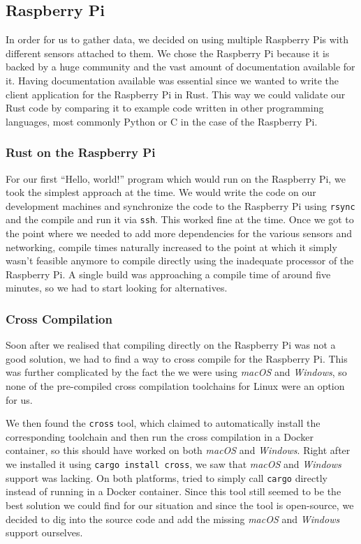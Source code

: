 \subsection{Raspberry Pi}

In order for us to gather data, we decided on using multiple Raspberry Pis with different sensors
attached to them. We chose the Raspberry Pi because it is backed by a huge community and the vast
amount of documentation available for it. Having documentation available was essential since we
wanted to write the client application for the Raspberry Pi in Rust. This way we could validate our
Rust code by comparing it to example code written in other programming languages, most commonly
Python or C in the case of the Raspberry Pi.

\subsubsection{Rust on the Raspberry Pi}

For our first “Hello, world!” program which would run on the Raspberry Pi, we took the simplest
approach at the time. We would write the code on our development machines and synchronize the code
to the Raspberry Pi using \texttt{rsync} and the compile and run it via \texttt{ssh}. This worked
fine at the time. Once we got to the point where we needed to add more dependencies for the various
sensors and networking, compile times naturally increased to the point at which it simply wasn't
feasible anymore to compile directly using the inadequate processor of the Raspberry Pi. A single
build was approaching a compile time of around five minutes, so we had to start looking for
alternatives.

\subsubsection{Cross Compilation}

Soon after we realised that compiling directly on the Raspberry Pi was not a good solution, we had
to find a way to cross compile for the Raspberry Pi. This was further complicated by the fact the we
were using \textit{macOS} and \textit{Windows}, so none of the pre-compiled cross compilation
toolchains for Linux were an option for us.

We then found the \texttt{cross} tool, which claimed to automatically install the corresponding
toolchain and then run the cross compilation in a Docker container, so this should have worked on
both \textit{macOS} and \textit{Windows}. Right after we installed it using \texttt{cargo install
cross}, we saw that \textit{macOS} and \textit{Windows} support was lacking. On both platforms,
tried to simply call \texttt{cargo} directly instead of running in a Docker container. Since this
tool still seemed to be the best solution we could find for our situation and since the tool is
open-source, we decided to dig into the source code and add the missing \textit{macOS} and
\textit{Windows} support ourselves.

